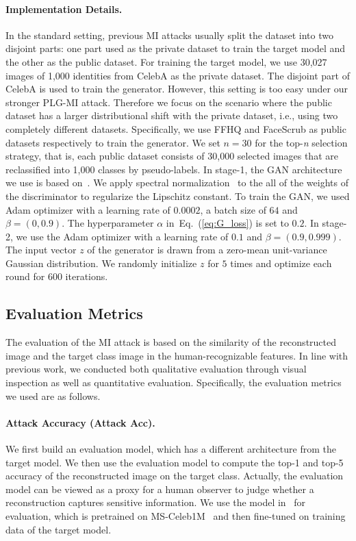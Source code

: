 \documentclass[letterpaper]{article} %
\newcommand{\Eref}[1]{Eq.~(\ref{#1})}
\begin{document}
\paragraph{Implementation Details.}
In the standard setting, previous MI attacks usually split the dataset into two disjoint parts: one part used as the private dataset to train the target model and the other as the public dataset. For training the target model, we use 30,027 images of 1,000 identities from CelebA as the private dataset. The disjoint part of CelebA is used to train the generator. However, this setting is too easy under our stronger PLG-MI attack. Therefore we focus on the scenario where the public dataset has a larger distributional shift with the private dataset, i.e., using two completely different datasets. Specifically, we use FFHQ and FaceScrub as public datasets respectively to train the generator. We set $n=30$ for the top-\emph{n} selection strategy, that is, each public dataset consists of 30,000 selected images that are reclassified into 1,000 classes by pseudo-labels. In stage-1, the GAN architecture we use is based on~\cite{miyato2018cgans}. We apply spectral normalization~\cite{miyato2018spectral} to the all of the weights of the discriminator to regularize the Lipschitz constant. To train the GAN, we used Adam optimizer with a learning rate of $0.0002$, a batch size of $64$ and $\beta=(0, 0.9)$. The hyperparameter $\alpha$ in~\Eref{eq:G_loss} is set to $0.2$. In stage-2, we use the Adam optimizer with a learning rate of $0.1$ and $\beta = (0.9, 0.999)$. The input vector $z$ of the generator is drawn from a zero-mean unit-variance Gaussian distribution. We randomly initialize $z$ for $5$ times and optimize each round for $600$ iterations.


\subsection{Evaluation Metrics}
The evaluation of the MI attack is based on the similarity of the reconstructed image and the target class image in the human-recognizable features. In line with previous work, we conducted both qualitative evaluation through visual inspection as well as quantitative evaluation. Specifically, the evaluation metrics we used are as follows.




\paragraph{Attack Accuracy (Attack Acc).}
We first build an evaluation model, which has a different architecture from the target model. We then use the evaluation model to compute the top-1 and top-5 accuracy of the reconstructed image on the target class. Actually, the evaluation model can be viewed as a proxy for a human observer to judge whether a reconstruction captures sensitive information. We use the model in~\cite{cheng2017know} for evaluation, which is pretrained on MS-Celeb1M~\cite{guo2016ms} and then fine-tuned on training data of the target model.
\end{document}
